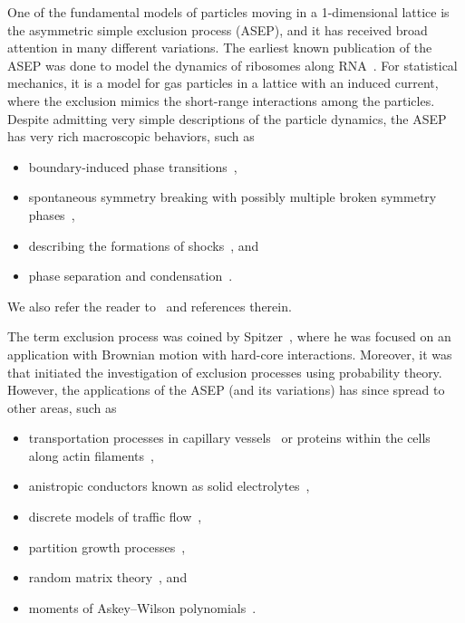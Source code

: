 \documentclass[reqno]{amsart}%
\newcommand{\0}{\phantom{c}}
\theoremstyle{plain}
\theoremstyle{definition}
\numberwithin{equation}{section}
\begin{document}
One of the fundamental models of particles moving in a 1-dimensional lattice
is the asymmetric simple exclusion process (ASEP), and it has received broad
attention in many different variations. The earliest known publication of the
ASEP was done to model the dynamics of ribosomes along RNA~\cite{MGP68}. For
statistical mechanics, it is a model for gas particles in a lattice with an
induced current, where the exclusion mimics the short-range interactions among
the particles. Despite admitting very simple descriptions of the particle
dynamics, the ASEP has very rich macroscopic behaviors, such as

\begin{itemize}
\item boundary-induced phase transitions~\cite{Krug91},

\item spontaneous symmetry breaking with possibly multiple broken symmetry
phases~\cite{AHR98,AHR99,CEM01,EFGM95,EPSZ05,GLEMSS95,PK07},

\item describing the formations of
shocks~\cite{DJLS93,Ferrari92,FF94,FF94II,Liggett76}, and

\item phase separation and condensation~\cite{EKKM98,JNHWW09,KLMST02,RSS00}.
\end{itemize}

We also refer the reader to~\cite{PEM09,Schutz01,SZ95,TJHJ16} and references therein.

The term exclusion process was coined by Spitzer~\cite{Spitzer70}, where he
was focused on an application with Brownian motion with hard-core
interactions. Moreover, it was~\cite{Spitzer70} that initiated the
investigation of exclusion processes using probability theory. However, the
applications of the ASEP (and its variations) has since spread to other areas,
such as

\begin{itemize}
\item transportation processes in capillary vessels~\cite{Levitt73} or
proteins within the cells along actin filaments~\cite{KNL05},

\item anistropic conductors known as solid electrolytes~\cite{CL99},

\item discrete models of traffic flow~\cite{Schad01},

\item partition growth processes~\cite{Lam15},

\item random matrix theory~\cite{Johansson00,TW09}, and

\item moments of Askey--Wilson polynomials~\cite{CW11}.
\end{itemize}
\end{document}
